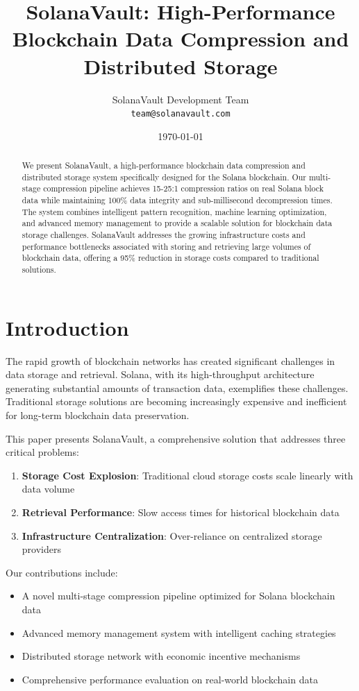 \documentclass[11pt,a4paper]{article}
\title{SolanaVault: High-Performance Blockchain Data Compression and Distributed Storage}
\author{
    SolanaVault Development Team\\
    \texttt{team@solanavault.com}
}
\date{\today}
\begin{document}
\maketitle

\begin{abstract}
We present SolanaVault, a high-performance blockchain data compression and distributed storage system specifically designed for the Solana blockchain. Our multi-stage compression pipeline achieves 15-25:1 compression ratios on real Solana block data while maintaining 100\% data integrity and sub-millisecond decompression times. The system combines intelligent pattern recognition, machine learning optimization, and advanced memory management to provide a scalable solution for blockchain data storage challenges. SolanaVault addresses the growing infrastructure costs and performance bottlenecks associated with storing and retrieving large volumes of blockchain data, offering a 95\% reduction in storage costs compared to traditional solutions.
\end{abstract}

\section{Introduction}

The rapid growth of blockchain networks has created significant challenges in data storage and retrieval. Solana, with its high-throughput architecture generating substantial amounts of transaction data, exemplifies these challenges. Traditional storage solutions are becoming increasingly expensive and inefficient for long-term blockchain data preservation.

This paper presents SolanaVault, a comprehensive solution that addresses three critical problems:

\begin{enumerate}
    \item \textbf{Storage Cost Explosion}: Traditional cloud storage costs scale linearly with data volume
    \item \textbf{Retrieval Performance}: Slow access times for historical blockchain data
    \item \textbf{Infrastructure Centralization}: Over-reliance on centralized storage providers
\end{enumerate}

Our contributions include:
\begin{itemize}
    \item A novel multi-stage compression pipeline optimized for Solana blockchain data
    \item Advanced memory management system with intelligent caching strategies
    \item Distributed storage network with economic incentive mechanisms
    \item Comprehensive performance evaluation on real-world blockchain data
\end{itemize}
\end{document}
